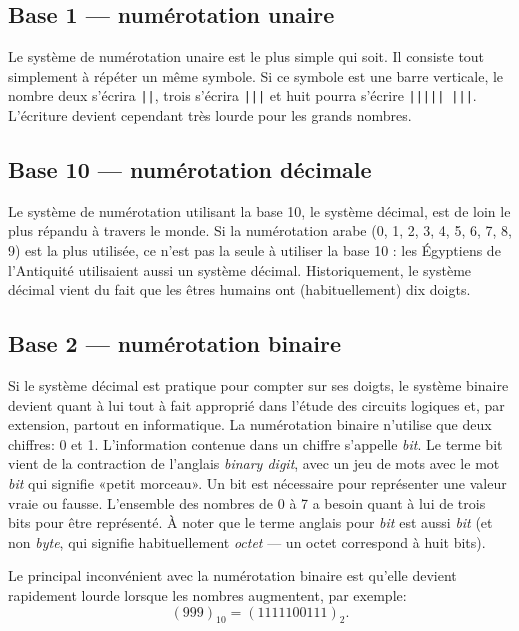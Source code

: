 \documentclass[canadien,12pt,oneside,letterpaper]{article}
\begin{document}
\subsection{Base 1 --- numérotation unaire}

Le système de numérotation unaire est le plus simple qui soit. Il consiste tout simplement à répéter un même symbole. Si ce symbole est une barre verticale, le nombre deux s'écrira \verb+||+, trois s'écrira \verb+|||+ et huit pourra s'écrire \verb+|||||+~\verb+|||+. L'écriture devient cependant très lourde pour les grands nombres.


\subsection{Base 10 --- numérotation décimale}

Le système de numérotation utilisant la base 10, le système décimal, est de loin le plus répandu à travers le monde. Si la numérotation arabe (0, 1, 2, 3, 4, 5, 6, 7, 8, 9) est la plus utilisée, ce n'est pas la seule à utiliser la base 10 : les Égyptiens de l'Antiquité utilisaient aussi un système décimal. Historiquement, le système décimal vient du fait que les êtres humains ont (habituellement) dix doigts.


\subsection{Base 2 --- numérotation binaire}

Si le système décimal est pratique pour compter sur ses doigts, le système binaire devient quant à lui tout à fait approprié dans l'étude des circuits logiques et, par extension, partout en informatique. La numérotation binaire n'utilise que deux chiffres: 0 et 1. L'information contenue dans un chiffre s'appelle \textit{bit}. Le terme bit vient de la contraction de l'anglais \textit{binary digit}, avec un jeu de mots avec le mot \textit{bit} qui signifie «petit morceau». Un bit est nécessaire pour représenter une valeur vraie ou fausse. L'ensemble des nombres de 0 à 7 a besoin quant à lui de trois bits pour être représenté. À noter que le terme anglais pour \textit{bit} est aussi \textit{bit} (et non \textit{byte}, qui signifie habituellement \textit{octet} --- un octet correspond à huit bits).

Le principal inconvénient avec la numérotation binaire est qu'elle devient rapidement lourde lorsque les nombres augmentent, par exemple:
\begin{equation*}
\left(999\right)_{10}=\left(1111100111\right)_2.
\end{equation*}
\end{document}
